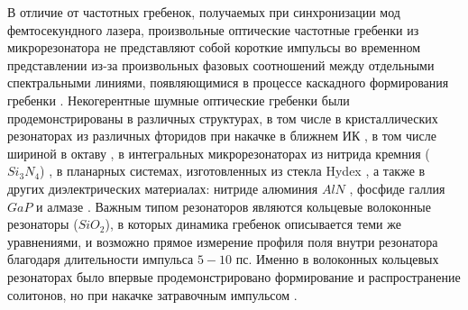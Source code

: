 В отличие от частотных гребенок, получаемых при синхронизации мод фемтосекундного лазера, произвольные оптические частотные гребенки из микрорезонатора не представляют собой короткие импульсы во временном представлении из-за произвольных фазовых соотношений между отдельными спектральными линиями, появляющимися в процессе каскадного формирования гребенки \cite{Herr2012,Chembo2010}. Некогерентные шумные оптические гребенки были продемонстрированы в различных структурах, в том числе в кристаллических резонаторах из различных фторидов при накачке в ближнем ИК \cite{Savchenkov2008,Grudinin2012,Liang2011,Grudinin2009,Henriet:15}, в том числе шириной в октаву \cite{DelHaye2011}, в интегральных микрорезонаторах из нитрида кремния ($Si_3N_4$) \cite{Levy2010,Okawachi2011,Johnson2012,Huang2015}, в планарных системах, изготовленных из стекла Hydex \cite{Moss2013,Razzari2010}, а также в других диэлектрических материалах: нитриде алюминия $AlN$ \cite{Jung2013}, фосфиде галлия $GaP$ \cite{2018arXiv180803554W} и алмазе \cite{Hausmann2014}. Важным типом резонаторов являются кольцевые волоконные резонаторы ($SiO_2$), в которых динамика гребенок описывается теми же уравнениями, и возможно прямое измерение профиля поля внутри резонатора благодаря длительности импульса $5-10$ пс. Именно в волоконных кольцевых резонаторах было впервые продемонстрировано формирование и распространение солитонов, но при накачке затравочным импульсом \cite{Leo2010}.

